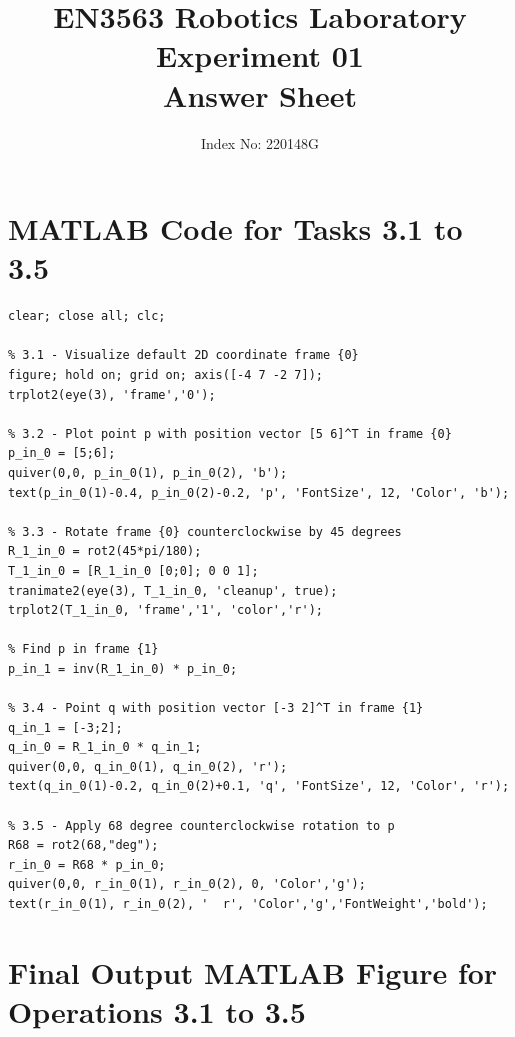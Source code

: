 \documentclass[11pt,a4paper]{article}
\title{EN3563 Robotics Laboratory Experiment 01\\
Answer Sheet}
\author{Index No: 220148G \hspace{3cm}}
\date{}
\begin{document}
\maketitle

\section{MATLAB Code for Tasks 3.1 to 3.5}

\begin{lstlisting}[style=matlab, caption={Task 1 MATLAB Code (3.1-3.5)}]
clear; close all; clc;

% 3.1 - Visualize default 2D coordinate frame {0}
figure; hold on; grid on; axis([-4 7 -2 7]);
trplot2(eye(3), 'frame','0');

% 3.2 - Plot point p with position vector [5 6]^T in frame {0}
p_in_0 = [5;6];
quiver(0,0, p_in_0(1), p_in_0(2), 'b');
text(p_in_0(1)-0.4, p_in_0(2)-0.2, 'p', 'FontSize', 12, 'Color', 'b');

% 3.3 - Rotate frame {0} counterclockwise by 45 degrees
R_1_in_0 = rot2(45*pi/180);
T_1_in_0 = [R_1_in_0 [0;0]; 0 0 1];
tranimate2(eye(3), T_1_in_0, 'cleanup', true);
trplot2(T_1_in_0, 'frame','1', 'color','r');

% Find p in frame {1}
p_in_1 = inv(R_1_in_0) * p_in_0;

% 3.4 - Point q with position vector [-3 2]^T in frame {1}
q_in_1 = [-3;2]; 
q_in_0 = R_1_in_0 * q_in_1;
quiver(0,0, q_in_0(1), q_in_0(2), 'r');
text(q_in_0(1)-0.2, q_in_0(2)+0.1, 'q', 'FontSize', 12, 'Color', 'r');

% 3.5 - Apply 68 degree counterclockwise rotation to p
R68 = rot2(68,"deg");           
r_in_0 = R68 * p_in_0;          
quiver(0,0, r_in_0(1), r_in_0(2), 0, 'Color','g');
text(r_in_0(1), r_in_0(2), '  r', 'Color','g','FontWeight','bold');
\end{lstlisting}

\section{Final Output MATLAB Figure for Operations 3.1 to 3.5}
\end{document}
